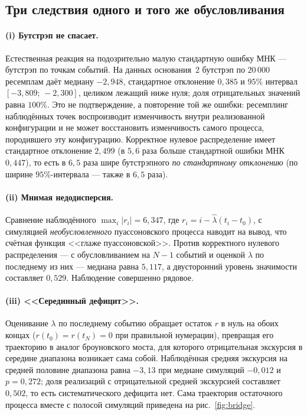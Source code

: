 \documentclass[11pt,a4paper]{article}
\theoremstyle{plain}
\theoremstyle{remark}
\begin{document}
\subsection{Три следствия одного и того же обусловливания}

\paragraph{(i) Бутстрэп не спасает.} Естественная реакция на подозрительно малую
стандартную ошибку МНК --- бутстрэп по точкам событий. На данных основания~2
бутстрэп по $20\,000$ ресемплам даёт медиану $-2{,}948$, стандартное отклонение
$0{,}385$ и $95\%$ интервал $[-3{,}809;\,-2{,}300]$, целиком лежащий ниже нуля; доля
отрицательных значений равна $100\%$. Это не подтверждение, а повторение той же ошибки:
ресемплинг наблюдённых точек воспроизводит изменчивость внутри реализованной
конфигурации и не может восстановить изменчивость самого процесса, породившего эту
конфигурацию. Корректное нулевое распределение имеет стандартное отклонение $2{,}499$
(в $5{,}6$ раза больше стандартной ошибки МНК $0{,}447$),
то есть в $6{,}5$ раза шире бутстрэпного \emph{по стандартному отклонению}
(по ширине $95\%$-интервала --- также в $6{,}5$ раза).

\paragraph{(ii) Мнимая недодисперсия.} Сравнение наблюдённого $\max_i|r_i|=6{,}347$,
где $r_i=i-\hat\lambda(t_i-t_0)$, с симуляцией \emph{необусловленного} пуассоновского
процесса наводит на вывод, что счётная функция <<глаже пуассоновской>>. Против
корректного нулевого распределения --- с обусловливанием на $N-1$ событий и оценкой
$\lambda$ по последнему из них --- медиана равна $5{,}117$, а двусторонний уровень
значимости составляет $0{,}529$. Наблюдение совершенно рядовое.

\paragraph{(iii) <<Серединный дефицит>>.} Оценивание $\lambda$ по последнему событию
обращает остаток $r$ в нуль на обоих концах ($r(t_0)=r(t_N)=0$ при правильной
нумерации), превращая его траекторию в аналог броуновского моста, для которого
отрицательная экскурсия в середине диапазона возникает сама собой. Наблюдённая средняя
экскурсия на средней половине диапазона равна $-3{,}13$ при медиане симуляций
$-0{,}012$ и $p=0{,}272$; доля реализаций с отрицательной средней экскурсией
составляет $0{,}502$, то есть систематического дефицита нет. Сама траектория
остаточного процесса вместе с полосой симуляций приведена на
рис.~\ref{fig:bridge}.
\end{document}
